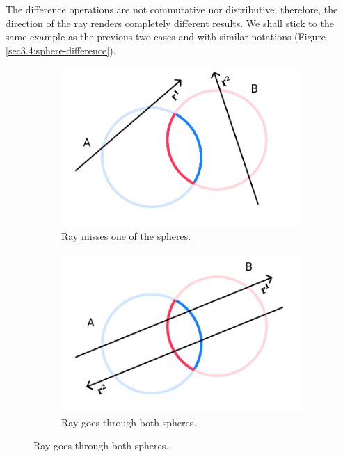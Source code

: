 \documentclass[a4paper,11pt,oneside]{article}
\begin{document}
The difference operations are not commutative nor distributive; therefore, the direction of the ray renders completely different results. We shall stick to the same example as the previous two cases and with similar notations (Figure \ref{sec3.4:sphere-difference}).

\begin{figure}[ht]
	\centering
	\begin{subfigure}[b]{0.3\textwidth}
		\centering
		\includegraphics[width=\textwidth]{section4/4.1/difference-case-2.png}
		\caption{Ray misses one of the spheres.}
		\label{sec3.4:difference-case-1}
	\end{subfigure}
	\hfill
	\begin{subfigure}[b]{0.3\textwidth}
		\centering
		\includegraphics[width=\textwidth]{section4/4.1/difference-case-1.png}
		\caption{Ray goes through both spheres.}
		\label{sec3.4:difference-case-2}

\end{subfigure}
\end{figure}
\end{document}

